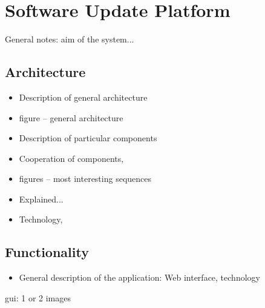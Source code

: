 \section{Software Update Platform}

General notes: aim of the system... 


\subsection{Architecture}

\begin{itemize}
	\item Description of general architecture 
	\item figure -- general architecture 
	\item Description of particular components 
	\item Cooperation of components, 
	\item figures -- most interesting sequences  
	\item Explained... 
	\item Technology, 
\end{itemize}


\subsection{Functionality}

\begin{itemize}
	\item General description of the application: Web interface, technology 
\end{itemize}

gui: 1 or 2 images 

